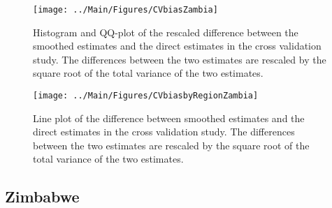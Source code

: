 \documentclass[12pt]{article}\usepackage[]{graphicx}\usepackage[]{color}
\newenvironment{knitrout}{}{} %
\begin{document}
\begin{knitrout}
\color{fgcolor}\begin{figure}[bht]

{\centering \texttt{[image: ../Main/Figures/CVbiasZambia]} 

}

\caption[Histogram and QQ-plot of the rescaled difference between the smoothed estimates and the direct estimates in the cross validation study]{Histogram and QQ-plot of the rescaled difference between the smoothed estimates and the direct estimates in the cross validation study. The differences between the two estimates are rescaled by the square root of the total variance of the two estimates.}\label{fig:unnamed-chunk-339}
\end{figure}


\end{knitrout}

\begin{knitrout}
\color{fgcolor}\begin{figure}[bht]

{\centering \texttt{[image: ../Main/Figures/CVbiasbyRegionZambia]} 

}

\caption[Line plot of the difference between smoothed estimates and the direct estimates in the cross validation study]{Line plot of the difference between smoothed estimates and the direct estimates in the cross validation study. The differences between the two estimates are rescaled by the square root of the total variance of the two estimates.}\label{fig:unnamed-chunk-340}
\end{figure}


\end{knitrout}



\clearpage
\subsection{Zimbabwe}


\end{document}
